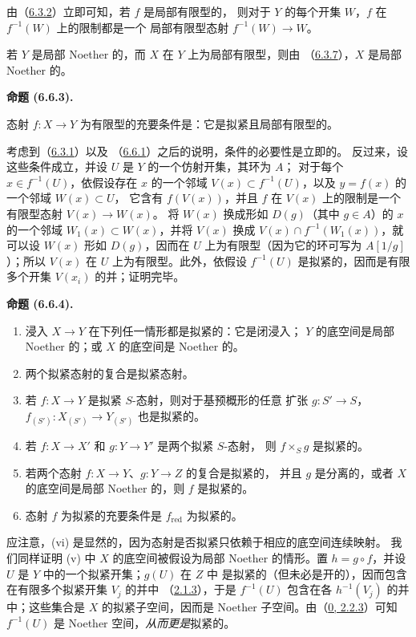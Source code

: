 \documentclass[UTF8,fontset=none,11pt,oneside,openany]{ctexbook}
\newenvironment{proposition}[1][]{%
  \par\medskip\noindent\textbf{命题 (#1).}\ %
}{\par}
\let\EGAOriginalLabel\label
\renewcommand{\label}[1]{\phantomsection\EGAOriginalLabel{#1}}
\begin{document}
由（\hyperref[I.6.3.2-fr]{6.3.2}）立即可知，若 $f$ 是局部有限型的，
则对于 $Y$ 的每个开集 $W$，$f$ 在 $f^{-1}(W)$ 上的限制都是一个
局部有限型态射 $f^{-1}(W)\to W$。

若 $Y$ 是局部 Noether 的，而 $X$ 在 $Y$ 上为局部有限型，则由
（\hyperref[I.6.3.7-fr]{6.3.7}），$X$ 是局部 Noether 的。

\begin{proposition}[6.6.3]
\label{I.6.6.3-fr}
态射 $f:X\to Y$ 为有限型的充要条件是：它是拟紧且局部有限型的。
\end{proposition}

考虑到（\hyperref[I.6.3.1-fr]{6.3.1}）以及
（\hyperref[I.6.6.1-fr]{6.6.1}）之后的说明，条件的必要性是立即的。
反过来，设这些条件成立，并设 $U$ 是 $Y$ 的一个仿射开集，其环为 $A$；
对于每个 $x\in f^{-1}(U)$，依假设存在 $x$ 的一个邻域
$V(x)\subset f^{-1}(U)$，以及 $y=f(x)$ 的一个邻域 $W(x)\subset U$，
它含有 $f(V(x))$，并且 $f$ 在 $V(x)$ 上的限制是一个有限型态射
$V(x)\to W(x)$。
将 $W(x)$ 换成形如 $D(g)$（其中 $g\in A$）的 $x$ 的一个邻域
$W_1(x)\subset W(x)$，并将 $V(x)$ 换成
$V(x)\cap f^{-1}(W_1(x))$，就可以设 $W(x)$ 形如 $D(g)$，因而在
$U$ 上为有限型（因为它的环可写为 $A[1/g]$）；所以 $V(x)$ 在 $U$
上为有限型。此外，依假设 $f^{-1}(U)$ 是拟紧的，因而是有限多个开集
$V(x_i)$ 的并；证明完毕。

\begin{proposition}[6.6.4]
\label{I.6.6.4-fr}
\begin{enumerate}
  \item[(i)] 浸入 $X\to Y$ 在下列任一情形都是拟紧的：它是闭浸入；
    $Y$ 的底空间是局部 Noether 的；或 $X$ 的底空间是 Noether 的。
  \item[(ii)] 两个拟紧态射的复合是拟紧态射。
  \item[(iii)] 若 $f:X\to Y$ 是拟紧 $S$-态射，则对于基预概形的任意
    扩张 $g:S'\to S$，$f_{(S')}:X_{(S')}\to Y_{(S')}$ 也是拟紧的。
  \item[(iv)] 若 $f:X\to X'$ 和 $g:Y\to Y'$ 是两个拟紧 $S$-态射，
    则 $f\times_S g$ 是拟紧的。
  \item[(v)] 若两个态射 $f:X\to Y$、$g:Y\to Z$ 的复合是拟紧的，
    并且 $g$ 是分离的，或者 $X$ 的底空间是局部 Noether 的，则 $f$
    是拟紧的。
  \item[(vi)] 态射 $f$ 为拟紧的充要条件是 $f_{\mathrm{red}}$ 为拟紧的。
\end{enumerate}
\end{proposition}

应注意，(vi) 是显然的，因为态射是否拟紧只依赖于相应的底空间连续映射。
我们同样证明 (v) 中 $X$ 的底空间被假设为局部 Noether 的情形。置
$h=g\circ f$，并设 $U$ 是 $Y$ 中的一个拟紧开集；$g(U)$ 在 $Z$ 中
是拟紧的（但未必是开的），因而包含在有限多个拟紧开集 $V_j$ 的并中
（\hyperref[I.2.1.3-fr]{2.1.3}），于是 $f^{-1}(U)$ 包含在各
$h^{-1}(V_j)$ 的并中；这些集合是 $X$ 的拟紧子空间，因而是 Noether
子空间。由（\hyperref[0.2.2.3-fr]{0, 2.2.3}）可知 $f^{-1}(U)$ 是
Noether 空间，\emph{从而更是}拟紧的。
\end{document}
